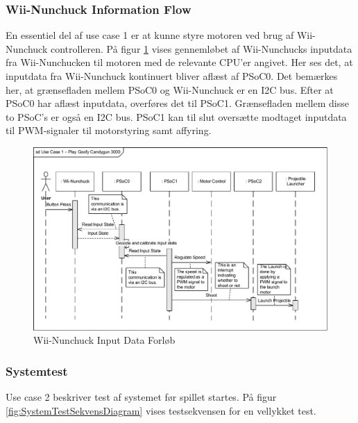 \subsubsection{Wii-Nunchuck Information Flow}
En essentiel del af use case 1 er at kunne styre motoren ved brug af Wii-Nunchuck controlleren. På figur \ref{fig:WiiNunchuckSekvensDiagram} vises gennemløbet af Wii-Nunchucks inputdata fra Wii-Nunchucken til motoren med de relevante CPU'er angivet. Her ses det, at inputdata fra Wii-Nunchuck kontinuert bliver aflæst af PSoC0. Det bemærkes her, at grænsefladen mellem PSoC0 og Wii-Nunchuck er en I2C bus. Efter at PSoC0 har aflæst inputdata, overføres det til PSoC1. Grænsefladen mellem disse to PSoC's er også en I2C bus. PSoC1 kan til slut oversætte modtaget inputdata til PWM-signaler til motorstyring samt affyring.

\begin{figure}[H]
	\centering
	\includegraphics[width=\textwidth] {Systemarkitektur/images/SequenceDiagramUC1}
	\caption{Wii-Nunchuck Input Data Forløb}
	\label{fig:WiiNunchuckSekvensDiagram}
\end{figure}

\subsubsection{Systemtest}
Use case 2 beskriver test af systemet før spillet startes. På figur \ref{fig:SystemTestSekvensDiagram} vises testsekvensen for en vellykket test. 

